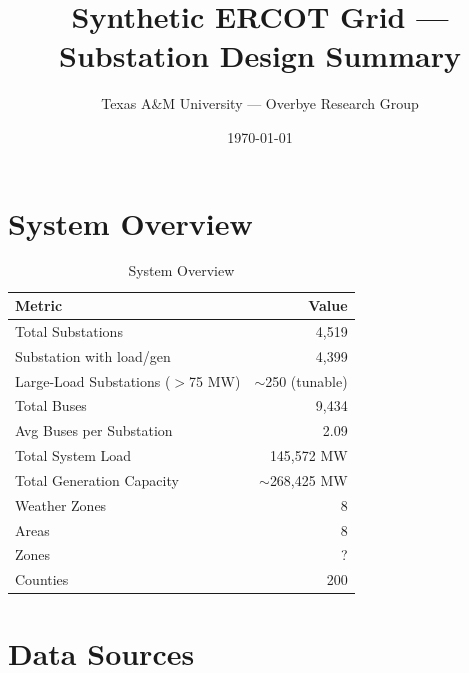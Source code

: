 \documentclass[11pt]{article}
\title{Synthetic ERCOT Grid --- Substation Design Summary}
\author{Texas A\&M University --- Overbye Research Group}
\date{\today}
\begin{document}
\maketitle

\section{System Overview}

\begin{table}[H]
\centering
\caption{System Overview}
\begin{tabular}{lr}
\toprule
\textbf{Metric} & \textbf{Value} \\
\midrule
Total Substations          & 4,519 \\
Substation with load/gen   & 4,399 \\
Large-Load Substations ($>$75 MW) & $\sim$250 (tunable) \\
Total Buses                & 9,434 \\
Avg Buses per Substation   & 2.09 \\
Total System Load          & 145,572 MW \\
Total Generation Capacity  & $\sim$268,425 MW \\
Weather Zones              & 8 \\
Areas                      & 8 \\
Zones                      & ? \\
Counties                   & 200 \\
\bottomrule
\end{tabular}
\end{table}

\section{Data Sources}
\end{document}
